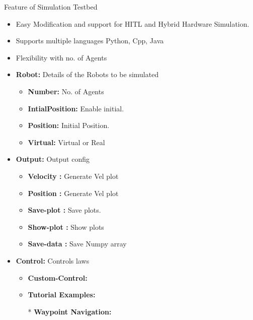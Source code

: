 \documentclass[10pt]{beamer}
\begin{document}
\begin{frame}{Feature of Simulation Testbed}
    \begin{itemize}
        \item Easy Modification and support for HITL and Hybrid Hardware Simulation.
        \item Supports multiple languages Python, Cpp, Java
        \item Flexibility with no. of Agents 
    \end{itemize}
\begin{minipage}{0.47\textwidth}
    \begin{itemize}
    \item \textbf{Robot:} Details of the Robots to be simulated
        \begin{itemize}
            \item \textbf{Number:} No. of Agents 
            \item \textbf{IntialPosition:} Enable initial.
            \item \textbf{Position:} Initial Position.
            \item \textbf{Virtual:} Virtual or Real
        \end{itemize}	
    \item \textbf{Output:} Output config
        \begin{itemize}
            \item \textbf{Velocity : }Generate Vel plot
            \item \textbf{Position : }Generate Vel plot
            \item \textbf{Save-plot : }Save plots.
            \item \textbf{Show-plot : }Show plots
            \item \textbf{Save-data : }Save Numpy array
        \end{itemize}
\end{itemize}
\end{minipage}
\begin{minipage}{0.47\textwidth}
    \begin{itemize}
        \item \textbf{Control: }Controls laws
        \begin{itemize}
            \item \textbf{Custom-Control: }
            \item \textbf{Tutorial Examples: }
            \item[*] \textbf{Waypoint Navigation:}
            \begin{itemize}

\end{itemize}
\end{itemize}
\end{itemize}
\end{minipage}
\end{frame}
\end{document}
